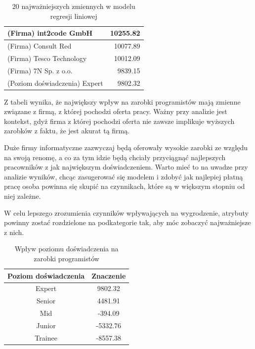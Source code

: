 \documentclass{article}
\begin{document}
\begin{table}[H]
\begin{tabular}{|l|r|}
        (Firma) int2code GmbH                     & 10255.82           \\ \hline
        (Firma) Consult Red                       & 10077.89           \\ \hline
        (Firma) Tesco Technology                  & 10012.09           \\ \hline
        (Firma) 7N Sp. z o.o.                     & 9839.15            \\ \hline
        (Poziom doświadczenia) Expert             & 9802.32            \\ \hline
    \end{tabular}
    \caption{20 najważniejszych zmiennych w modelu regresji liniowej}
    \label{tab:importance}
\end{table}

Z tabeli wynika, że największy wpływ na zarobki programistów mają zmienne związane z firmą,
z której pochodzi oferta pracy. Ważny przy analizie jest kontekst, gdyż firma z której
pochodzi oferta nie zawsze implikuje wyższych zarobków z faktu, że jest akurat tą firmą.


Duże firmy informatyczne zazwyczaj będą oferowały wysokie zarobki ze względu na swoją renomę,
a co za tym idzie będą chciały przyciągnąć najlepszych pracowników z jak największym doświadczeniem.
Warto mieć to na uwadze przy analizie wyników, chcąc zasugerować się modelem
i zdobyć jak najlepiej płatną pracę osoba powinna się skupić na czynnikach, które są
w większym stopniu od niej zależne.

\bigskip

W celu lepszego zrozumienia czynników wpływających na wygrodzenie, atrybuty powinny zostać
rozdzielone na podkategorie tak, aby móc zobaczyć najważniejsze z nich.

\begin{table}[H]
    \centering
    \begin{tabular}{|c|c|}
        \hline
        \textbf{Poziom doświadczenia} & \textbf{Znaczenie} \\ \hline
        Expert                        & 9802.32            \\ \hline
        Senior                        & 4481.91            \\ \hline
        Mid                           & -394.09            \\ \hline
        Junior                        & -5332.76           \\ \hline
        Trainee                       & -8557.38           \\ \hline
    \end{tabular}
    \caption{Wpływ poziomu doświadczenia na zarobki programistów}
    \label{tab:experience}
\end{table}
\end{document}
